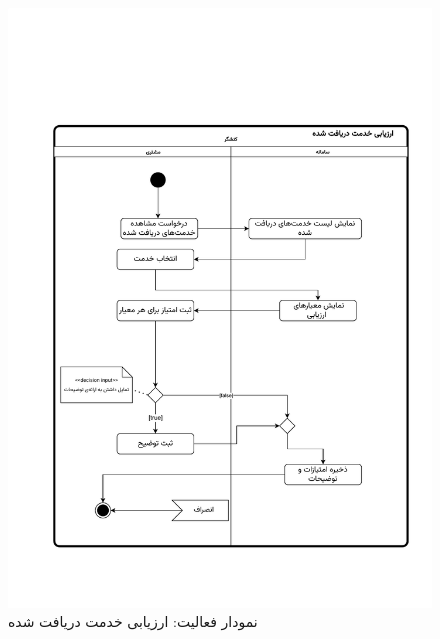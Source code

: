 \begin{figure}[ht!]
	\centering
	\includegraphics[scale=0.6, page=1]{figs/OOD-activity-evaluatereqrecv.pdf}
	\caption{نمودار فعالیت: ارزیابی خدمت دریافت شده}
\end{figure}
\FloatBarrier
\newpage

